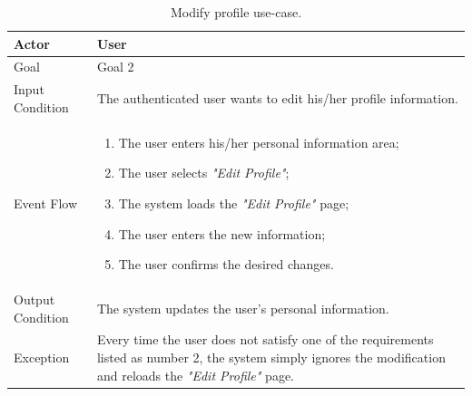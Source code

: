\begin{table}[H]
\begin{center}
\begin{tabular}{p{} | p{}}
\hline
Actor & User\\
\hline
Goal & Goal 2\\
\hline
Input Condition & The authenticated user wants to edit his/her profile information.\\
\hline
Event Flow & 
\begin{enumerate}
\item The user enters his/her personal information area;
\item The user selects \emph{"Edit Profile"};
\item The system loads the \emph{"Edit Profile"} page;
\item The user enters the new information;
\item The user confirms the desired changes.
\end{enumerate} \\
\hline
Output Condition & The system updates the user's personal information.\\
\hline
Exception & Every time the user does not satisfy one of the requirements listed as number 2, the system simply ignores the modification and reloads the \emph{"Edit Profile"} page.\\
\hline
\end{tabular}
\end{center}
\caption{Modify profile use-case.}
\label{modify_profile_uc}
\end{table}


